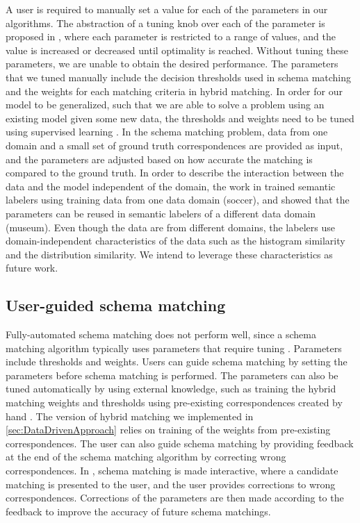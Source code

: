 A user is required to manually set a value for each of the parameters in our algorithms. The abstraction of a tuning knob over each of the parameter is proposed in \cite{books/sp/bellahsene11}, where each parameter is restricted to a range of values, and the value is increased or decreased until optimality is reached. Without tuning these parameters, we are unable to obtain the desired performance. The parameters that we tuned manually include the decision thresholds used in schema matching and the weights for each matching criteria in hybrid matching. In order for our model to be generalized, such that we are able to solve a problem using an existing model given some new data, the thresholds and weights need to be tuned using supervised learning \cite{Duchateau2009YAM,Doan2001Reconciling}. In the schema matching problem, data from one domain and a small set of ground truth correspondences are provided as input, and the parameters are adjusted based on how accurate the matching is compared to the ground truth. In order to describe the interaction between the data and the model independent of the domain, the work in \cite{Pham2016Semantic} trained semantic labelers using training data from one data domain (soccer), and showed that the parameters can be reused in semantic labelers of a different data domain (museum). Even though the data are from different domains, the labelers use domain-independent characteristics of the data such as the histogram similarity and the distribution similarity. We intend to leverage these characteristics as future work.

\subsection{User-guided schema matching}

Fully-automated schema matching does not perform well, since a schema matching algorithm typically uses parameters that require tuning \cite{books/sp/bellahsene11}. Parameters include thresholds and weights. Users can guide schema matching by setting the parameters before schema matching is performed. The parameters can also be tuned automatically by using external knowledge, such as training the hybrid matching weights and thresholds using pre-existing correspondences created by hand \cite{Ehrig2004QOM}. The version of hybrid matching we implemented in \autoref{sec:DataDrivenApproach} relies on training of the weights from pre-existing correspondences. The user can also guide schema matching by providing feedback at the end of the schema matching algorithm by correcting wrong correspondences. In \cite{Duchateau2009YAM}, schema matching is made interactive, where a candidate matching is presented to the user, and the user provides corrections to wrong correspondences. Corrections of the parameters are then made according to the feedback to improve the accuracy of future schema matchings.

